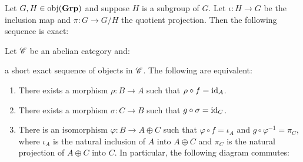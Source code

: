 \begin{example}
	Let $G,H \in \operatorname{obj}({\normalfont\textbf{Grp}})$ and suppose $H$ is a subgroup of $G$. Let $\iota:H \rightarrow G$ be the inclusion map and $\pi: G \rightarrow G/H$ the quotient projection. Then the following sequence is exact:
	\begin{center}
	\end{center}
\end{example}

\begin{lemma}\label{lemma:splitting-lemma}
	Let $\mathscr{C}$ be an abelian category and:
	\begin{center}
	\end{center}
	a short exact sequence of objects in $\mathscr{C}$. The following are equivalent:
	\mbox{}
	\begin{enumerate}[label = (\arabic*),itemsep=1pt,topsep=3pt]
		\item There exists a morphism $\rho:B \rightarrow A$ such that $\rho \circ f = \operatorname{id}_A$.
		\item There exists a morphism $\sigma:C \rightarrow B$ such that $g \circ \sigma = \operatorname{id}_C$.
		\item There is an isomorphism $\varphi:B \rightarrow A \oplus C$ such that $\varphi \circ f = \iota_A$ and $g \circ \varphi^{-1} = \pi_C$, where $\iota_A$ is the natural inclusion of $A$ into $A \oplus C$ and $\pi_C$ is the natural projection of $A \oplus C$ into $C$. In particular, the following diagram commutes:
			\begin{center}
			\end{center}
	\end{enumerate}
\end{lemma}
